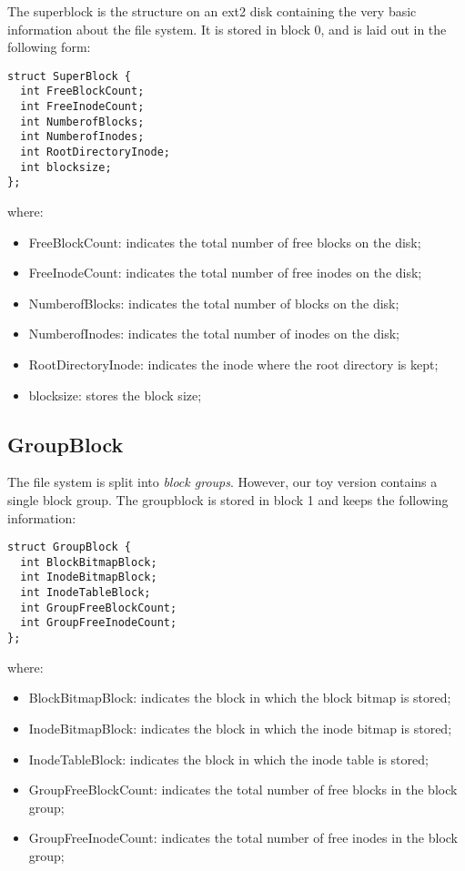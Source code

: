 \documentclass{article}
\begin{document}
\begin{flushleft}
The superblock is the structure on an ext2 disk containing the very basic 
information about the file system. It is stored in block 0, and is laid out 
in the following form:

\begin{verbatim}
struct SuperBlock {
  int FreeBlockCount;
  int FreeInodeCount;
  int NumberofBlocks;
  int NumberofInodes;
  int RootDirectoryInode;
  int blocksize;
};
\end{verbatim}

where:


\begin{itemize}
  \item{FreeBlockCount: indicates the total number of free blocks on the disk;}
  \item{FreeInodeCount: indicates the total number of free inodes on the disk;}
  \item{NumberofBlocks: indicates the total number of blocks on the disk;}
  \item{NumberofInodes: indicates the total number of inodes on the disk;}
  \item{RootDirectoryInode: indicates the inode where the root directory is 
kept;}
  \item{blocksize: stores the block size;}
\end{itemize}


\subsection*{GroupBlock}

The file system is split into {\it block groups}.  However, our toy version 
contains a single block group.   The groupblock is stored in block 1 and keeps 
the following information:
\begin{verbatim}
struct GroupBlock {
  int BlockBitmapBlock;
  int InodeBitmapBlock;
  int InodeTableBlock;
  int GroupFreeBlockCount;
  int GroupFreeInodeCount;
};
\end{verbatim}

where:


\begin{itemize}
  \item{BlockBitmapBlock:  indicates the block in which the block bitmap is stored;}
  \item{InodeBitmapBlock:  indicates the block in which the inode bitmap is stored;}
  \item{InodeTableBlock:  indicates the block in which the inode table is stored;}
  \item{GroupFreeBlockCount: indicates the total number of free blocks in the block group;}
  \item{GroupFreeInodeCount: indicates the total number of free inodes in the block group;}


\end{itemize}
\end{flushleft}
\end{document}
